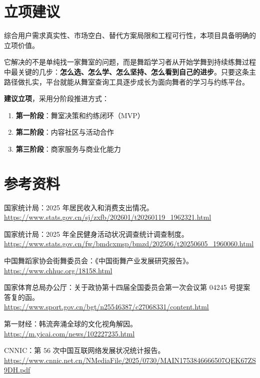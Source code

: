 \documentclass[12pt,a4paper]{ctexart}
\begin{document}
\section{立项建议}

综合用户需求真实性、市场空白、替代方案局限和工程可行性，本项目具备明确的立项价值。

它解决的不是单纯找一家舞室的问题，而是舞蹈学习者从开始学舞到持续练舞过程中最关键的几步：\textbf{怎么选、怎么学、怎么坚持、怎么看到自己的进步}。只要这条主路径做扎实，平台就能从舞室查询工具逐步成长为面向舞者的学习与约练平台。

\vspace{0.5em}
\textbf{建议立项}，采用分阶段推进方式：
\begin{enumerate}
    \item \textbf{第一阶段}：舞室决策和约练闭环（MVP）
    \item \textbf{第二阶段}：内容社区与活动合作
    \item \textbf{第三阶段}：商家服务与商业化能力
\end{enumerate}

\section*{参考资料}

\begin{enumerate}[label={[\arabic*]}]
    \item 国家统计局：2025 年居民收入和消费支出情况。\\\url{https://www.stats.gov.cn/sj/zxfb/202601/t20260119_1962321.html}
    \item 国家统计局：2025 年全民健身活动状况调查统计调查制度。\\\url{https://www.stats.gov.cn/fw/bmdcxmsp/bmzd/202506/t20250605_1960060.html}
    \item 中国舞蹈家协会街舞委员会：《中国街舞产业发展研究报告》。\\\url{https://www.chhuc.org/18158.html}
    \item 国家体育总局办公厅：关于政协第十四届全国委员会第一次会议第 04245 号提案答复的函。\\\url{https://www.sport.gov.cn/bgt/n25546387/c27068331/content.html}
    \item 第一财经：韩流奔涌全球的文化视角解因。\\\url{https://m.yicai.com/news/102227235.html}
    \item CNNIC：第 56 次中国互联网络发展状况统计报告。\\\url{https://www.cnnic.net.cn/NMediaFile/2025/0730/MAIN1753846666507QEK67ZS9DH.pdf}
\end{enumerate}
\end{document}
